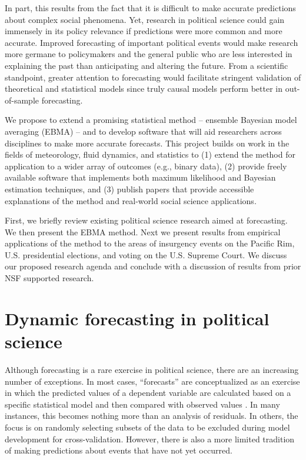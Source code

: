 \documentclass[pdftex,12pt,fullpage,oneside]{amsart}
\begin{document}
In part, this results from the fact that it is difficult to make
accurate predictions about complex social phenomena. Yet, research in
political science could gain immensely in its policy relevance if
predictions were more common and more accurate.  Improved forecasting
of important political events would make research more germane to
policymakers and the general public who are less interested in
explaining the past than anticipating and altering the future.  From a
scientific standpoint, greater attention to forecasting would
facilitate stringent validation of theoretical and statistical models
since truly causal models perform better in out-of-sample forecasting.

We propose to extend a promising statistical method -- ensemble
Bayesian model averaging (EBMA) -- and to develop software that will
aid researchers across disciplines to make more accurate forecasts.
This project builds on work in the fields of meteorology, fluid
dynamics, and statistics to (1) extend the method for application to a
wider array of outcomes (e.g., binary data), (2) provide freely
available software that implements both maximum likelihood and
Bayesian estimation techniques, and (3) publish papers that provide
accessible explanations of the method and real-world social science
applications.

First, we briefly review existing political science research aimed at
forecasting.  We then present the EBMA method.  Next we present
results from empirical applications of the method to the areas of
insurgency events on the Pacific Rim, U.S. presidential elections, and
voting on the U.S. Supreme Court.  We discuss our proposed research
agenda and conclude with a discussion of results from prior NSF
supported research.

\section{Dynamic forecasting in political science}

Although forecasting is a rare exercise in political science, there
are an increasing number of exceptions.  In most cases, ``forecasts''
are conceptualized as an exercise in which the predicted values of a
dependent variable are calculated based on a specific statistical
model and then compared with observed values
\citep[e.g.,][]{Hildebrand:etal:1976}. In many instances, this becomes
nothing more than an analysis of residuals.  In others, the focus is
on randomly selecting subsets of the data to be excluded during model
development for cross-validation.  However, there is also a more
limited tradition of making predictions about events that have not yet
occurred.
\end{document}
